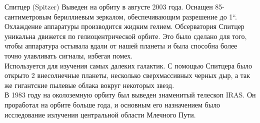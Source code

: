 \documentclass[12pt]{article}
\begin{document}
	Спитцер (Spitzer) Выведен на орбиту в августе 2003 года.
	Оснащен 85-сантиметровым бериллиевым зеркалом, обеспечивающим
	разрешение до 1“. Охлаждение аппаратуры производится жидким гелием.
	Обсерватория Спитцер уникальна движется по гелиоцентрической орбите. Это
	было сделано для того, чтобы аппаратура остывала вдали от нашей планеты и
	была способна более точно улавливать сигналы, избегая помех.\\
	Используется для изучения самых далеких
	галактик.
	С помощью Спитцера было открыто
	2 внесолнечные планеты,
	несколько сверхмассивных черных дыр,
	а так же гигантские пылевые облака
	вокруг некоторых звезд.\\
	В 1983 году на околоземную орбиту был выведен
	знаменитый телескоп IRAS. Он проработал на орбите
	больше года, и основным его назначением было
	исследование излучения центральной области Млечного
	Пути.
	     
\end{document}

